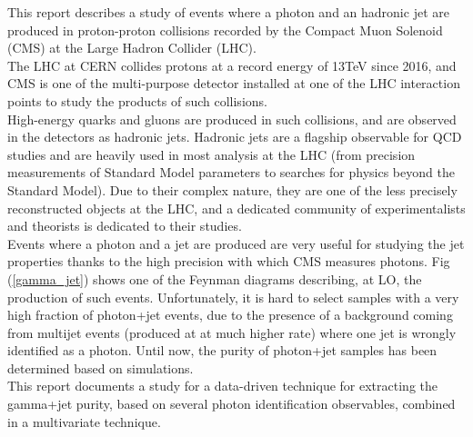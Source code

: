 
This report describes a study of events where a photon and an hadronic jet are produced in proton-proton 
collisions recorded by the Compact Muon Solenoid (CMS) at the Large Hadron Collider (LHC).\\

The LHC at CERN collides protons at a record energy of 13TeV since 2016, and CMS is one of the multi-purpose 
detector installed at one of the LHC interaction points to study the products of such collisions.\\

High-energy quarks and gluons are produced in such collisions, and are observed in the detectors as hadronic jets. 
Hadronic jets are a flagship observable for QCD studies and are heavily used in most analysis at the LHC (from 
precision measurements of Standard Model parameters to searches for physics beyond the Standard Model). 
Due to their complex nature, they are one of the less precisely reconstructed objects at the LHC, and a 
dedicated community of experimentalists and theorists is dedicated to their studies.\\
Events where a photon and a jet are produced are very useful for studying the jet properties thanks to the high
precision 
with which CMS measures photons. Fig (\ref{gamma_jet}) shows one of the Feynman diagrams describing, at LO, the production of such
events. 
Unfortunately, it is hard to select samples with a very high fraction of photon+jet events, 
due to the presence of a background coming from multijet events (produced at at much higher rate) where one jet is 
wrongly identified as a photon. Until now, the purity of photon+jet samples has been determined based on simulations.\\

This report documents a study for a data-driven technique for extracting the gamma+jet purity, based on several photon 
identification observables, combined in a multivariate technique.\\


